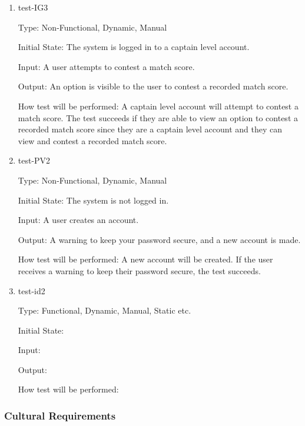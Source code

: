 \documentclass[12pt, titlepage]{article}
\begin{document}
\begin{enumerate}
  \item{test-IG3\\}

  Type: Non-Functional, Dynamic, Manual

  Initial State: The system is logged in to a captain level account.

  Input: A user attempts to contest a match score.

  Output: An option is visible to the user to contest a recorded match score.

  How test will be performed: A captain level account will attempt to
  contest a match score. The test succeeds if they are able to view an option to contest
  a recorded match score since they are a captain level account and they can view and contest
  a recorded match score.

  \item{test-PV2\\}

  Type: Non-Functional, Dynamic, Manual

  Initial State: The system is not logged in.

  Input: A user creates an account.

  Output: A warning to keep your password secure, and a new account is made.

  How test will be performed: A new account will be created. If the user 
  receives a warning to keep their password secure, the test succeeds.

  \item{test-id2\\}
  
  Type: Functional, Dynamic, Manual, Static etc.
            
  Initial State: 
            
  Input: 
            
  Output: 
            
  How test will be performed: 
  
\end{enumerate}

\subsubsection{Cultural Requirements}
\end{document}
